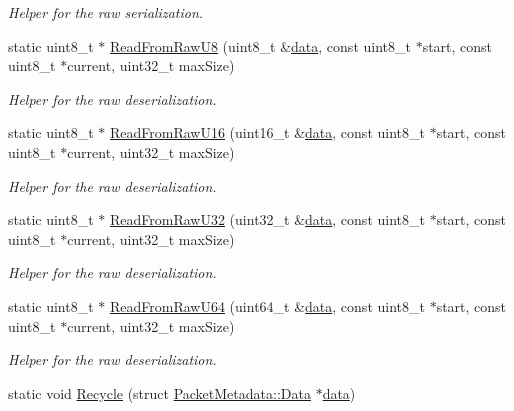 \begin{DoxyCompactItemize}
\begin{DoxyCompactList}\small\item\em Helper for the raw serialization. \end{DoxyCompactList}\item 
static uint8\+\_\+t $\ast$ \hyperlink{classns3_1_1PacketMetadata_aeab158c490a41b3776aab0b26092ff50}{Read\+From\+Raw\+U8} (uint8\+\_\+t \&\hyperlink{topology-example-sim_8cc_a26c65296e316af77b787dc77469bb2a4}{data}, const uint8\+\_\+t $\ast$start, const uint8\+\_\+t $\ast$current, uint32\+\_\+t max\+Size)
\begin{DoxyCompactList}\small\item\em Helper for the raw deserialization. \end{DoxyCompactList}\item 
static uint8\+\_\+t $\ast$ \hyperlink{classns3_1_1PacketMetadata_a9466105641875317279a17991707e308}{Read\+From\+Raw\+U16} (uint16\+\_\+t \&\hyperlink{topology-example-sim_8cc_a26c65296e316af77b787dc77469bb2a4}{data}, const uint8\+\_\+t $\ast$start, const uint8\+\_\+t $\ast$current, uint32\+\_\+t max\+Size)
\begin{DoxyCompactList}\small\item\em Helper for the raw deserialization. \end{DoxyCompactList}\item 
static uint8\+\_\+t $\ast$ \hyperlink{classns3_1_1PacketMetadata_a5a055957d2f52aeee983871a358215a7}{Read\+From\+Raw\+U32} (uint32\+\_\+t \&\hyperlink{topology-example-sim_8cc_a26c65296e316af77b787dc77469bb2a4}{data}, const uint8\+\_\+t $\ast$start, const uint8\+\_\+t $\ast$current, uint32\+\_\+t max\+Size)
\begin{DoxyCompactList}\small\item\em Helper for the raw deserialization. \end{DoxyCompactList}\item 
static uint8\+\_\+t $\ast$ \hyperlink{classns3_1_1PacketMetadata_a069d077359e7d6dac6b575b12584a7ae}{Read\+From\+Raw\+U64} (uint64\+\_\+t \&\hyperlink{topology-example-sim_8cc_a26c65296e316af77b787dc77469bb2a4}{data}, const uint8\+\_\+t $\ast$start, const uint8\+\_\+t $\ast$current, uint32\+\_\+t max\+Size)
\begin{DoxyCompactList}\small\item\em Helper for the raw deserialization. \end{DoxyCompactList}\item 
static void \hyperlink{classns3_1_1PacketMetadata_ae4bff0e3145f955d12e75531b0be6b7f}{Recycle} (struct \hyperlink{structns3_1_1PacketMetadata_1_1Data}{Packet\+Metadata\+::\+Data} $\ast$\hyperlink{topology-example-sim_8cc_a26c65296e316af77b787dc77469bb2a4}{data})

\end{DoxyCompactItemize}

